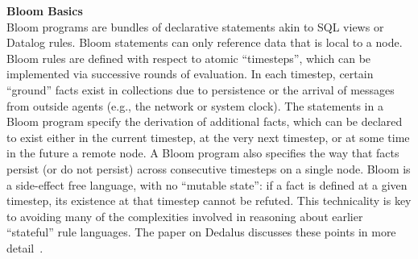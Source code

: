 \noindent\textbf{Bloom Basics}\\
\noindent
Bloom programs are bundles of declarative statements akin to SQL views or Datalog rules.  Bloom statements can only reference data that is local to a node.  Bloom rules are defined with respect to atomic ``timesteps'', which can be implemented via successive rounds of evaluation. In each timestep, certain ``ground'' facts exist in collections due to persistence or the arrival of messages from outside agents (e.g., the network or system clock).  The statements in a Bloom program specify the derivation of additional facts, which can be declared to exist either in the current timestep, at the very next timestep, or at some time in the future a remote node.  A Bloom program also specifies the way that facts persist (or do not persist) across consecutive timesteps on a single node.  Bloom is a side-effect free language, with no ``mutable state'': if a fact is defined at a given timestep, its existence at that timestep cannot be refuted.  This technicality is key to avoiding many of the complexities involved in reasoning about earlier ``stateful'' rule languages.  The paper on Dedalus discusses these points in more detail~\cite{dedalus-techr}.

